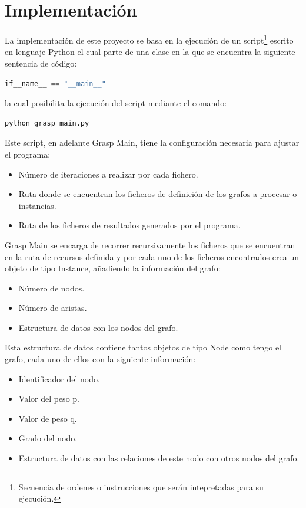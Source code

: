 \section{Implementación}
\label{sec:implementacion}
La implementación de este proyecto se basa en la ejecución de un script\footnote{Secuencia de ordenes o instrucciones que serán intepretadas para su ejecución.} escrito en lenguaje Python el cual parte de una clase en la que se encuentra la siguiente sentencia de código:
 \begin{lstlisting}[language=Python]
 if__name__ == "__main__"
 \end{lstlisting}
 la cual posibilita la ejecución del script mediante el comando:
  \begin{lstlisting}[language=bash]
  python grasp_main.py
 \end{lstlisting} 

 Este script, en adelante Grasp Main, tiene la configuración necesaria para ajustar el programa:
 \begin{itemize}
 	\item Número de iteraciones a realizar por cada fichero.
 	\item Ruta donde se encuentran los ficheros de definición de los grafos a procesar o instancias.
 	\item Ruta de los ficheros de resultados generados por el programa.	
 \end{itemize}

Grasp Main se encarga de recorrer recursivamente los ficheros que se encuentran en la ruta de recursos definida y por cada uno de los ficheros encontrados crea un objeto de tipo Instance, añadiendo la información del grafo:
 \begin{itemize}
	\item Número de nodos.
	\item Número de aristas.
	\item Estructura de datos con los nodos del grafo.
\end{itemize}

Esta estructura de datos contiene tantos objetos de tipo Node como tengo el grafo, cada uno de ellos con la siguiente información:
 \begin{itemize}
	\item Identificador del nodo.
	\item Valor del peso p.
	\item Valor de peso q.
	\item Grado del nodo.
	\item Estructura de datos con las relaciones de este nodo con otros nodos del grafo.
\end{itemize}


